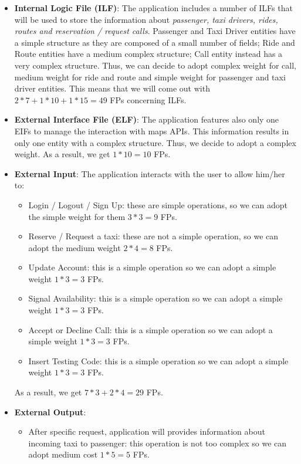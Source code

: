 \begin{itemize}
	\item \textbf{Internal Logic File (ILF)}: The application includes a number of ILFs that will be used to store the information about \textit{passenger, taxi drivers, rides, routes and reservation / request calls}. Passenger and Taxi Driver entities have a simple structure as they are composed of a small number of fields; Ride and Route entities have a medium complex structure; Call entity instead has a very complex structure. Thus, we can decide to adopt complex weight for call, medium weight for ride and route and simple weight for passenger and taxi driver entities. This means that we will come out with $2*7 + 1*10 + 1*15 = 49$ FPs concerning ILFs.
	\item \textbf{External Interface File (ELF)}: The application features also only one EIFs to manage the interaction with maps APIs. This information results in only one entity with a complex structure. Thus, we decide to adopt a complex weight. As a result, we get $1*10 = 10$ FPs.
	\item \textbf{External Input}: The application interacts with the user to allow him/her to:
	\begin{itemize}
		\item Login / Logout / Sign Up: these are simple operations, so we can adopt the simple weight for them $3*3 = 9$ FPs.
		\item Reserve / Request a taxi: these are not a simple operation, so we can adopt the medium weight $2*4 = 8$ FPs.
		\item Update Account: this is a simple operation so we can adopt a simple weight $1*3 = 3$ FPs.
		\item Signal Availability: this is a simple operation so we can adopt a simple weight $1*3 = 3$ FPs.
		\item Accept or Decline Call: this is a simple operation so we can adopt a simple weight $1*3 = 3$ FPs.
		\item Insert Testing Code: this is a simple operation so we can adopt a simple weight $1*3 = 3$ FPs.
	\end{itemize}
	As a result, we get $7*3 + 2*4 = 29$ FPs.
	\item \textbf{External Output}:
	\begin{itemize}
		\item After specific request, application will provides information about incoming taxi to passenger: this operation is not too complex so we can adopt medium cost $1*5 = 5$ FPs.

\end{itemize}
\end{itemize}
